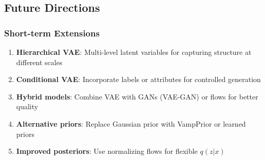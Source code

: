\documentclass[conference]{IEEEtran}
\begin{document}
\begin{table}[!t]
\centering
\small
{}
\caption{Comparison of VAE with other generative modeling approaches}
\label{tab:generative_comparison}
\end{table}

\subsection{Future Directions}

\subsubsection{Short-term Extensions}

\begin{enumerate}
    \item \textbf{Hierarchical VAE}: Multi-level latent variables for capturing structure at different scales
    
    \item \textbf{Conditional VAE}: Incorporate labels or attributes for controlled generation
    
    \item \textbf{Hybrid models}: Combine VAE with GANs (VAE-GAN) or flows for better quality
    
    \item \textbf{Alternative priors}: Replace Gaussian prior with VampPrior or learned priors
    
    \item \textbf{Improved posteriors}: Use normalizing flows for flexible $q(z|x)$
\end{enumerate}
\end{document}
